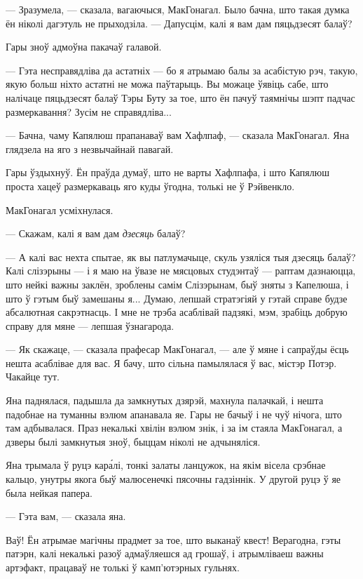 --- Зразумела, --- сказала, вагаючыся, МакГонагал. Было бачна, што такая думка ён 
ніколі дагэтуль не прыходзіла. --- Дапусцім, калі я вам дам пяцьдзесят балаў?

Гары зноў адмоўна пакачаў галавой. 

--- Гэта несправядліва да астатніх --- бо я атрымаю балы за асабістую рэч, такую, якую
больш ніхто астатні не можа паўтарыць. Вы можаце ўявіць сабе, што налічаце пяцьдзесят 
балаў Тэры Буту за тое, што ён пачуў таямнічы шэпт падчас размеркавання? Зусім 
не справядліва...

--- Бачна, чаму Капялюш прапанаваў вам Хафлпаф, --- сказала МакГонагал. Яна глядзела 
на яго з незвычайнай павагай.

Гары ўздыхнуў. Ён праўда думаў, што не варты Хафлпафа, і што Капялюш проста 
хацеў размеркаваць яго куды ўгодна, толькі не ў Рэйвенкло.

МакГонагал усміхнулася.

--- Скажам, калі я вам дам \emph{дзесяць} балаў?

--- А калі вас нехта спытае, як вы патлумачыце, скуль узяліся тыя дзесяць балаў?
Калі слізэрыны --- і я маю на ўвазе не мясцовых студэнтаў --- раптам дазнаюцца,
што нейкі важны заклён, зроблены самім Слізэрынам, быў зняты з Капелюша, і што 
ў гэтым быў замешаны я... Думаю, лепшай стратэгіяй у гэтай справе будзе 
абсалютная сакрэтнасць. І мне не трэба асаблівай падзякі, мэм, зрабіць 
добрую справу для мяне --- лепшая ўзнагарода. 

--- Як скажаце, --- сказала прафесар МакГонагал, --- але ў мяне і сапраўды ёсць нешта
асаблівае для вас. Я бачу, што сільна памылялася ў вас, містэр Потэр. Чакайце тут.

Яна паднялася, падышла да замкнутых дзярэй, махнула палачкай, і нешта падобнае на 
туманны вэлюм апанавала яе. Гары не бачыў і не чуў нічога, што там адбывалася.
Праз некалькі хвілін вэлюм знік, і за ім стаяла МакГонагал, а дзверы былі замкнутыя 
зноў, быццам ніколі не адчыняліся.

Яна трымала ў руцэ кар\'алі, тонкі залаты ланцужок, на якім вісела срэбнае кальцо,
унутры якога быў малюсенечкі пясочны гадзіннік. У другой руцэ ў яе была нейкая папера.

--- Гэта вам, --- сказала яна.

Ваў! Ён атрымае магічны прадмет за тое, што выканаў квест! Верагодна, гэты патэрн,
калі некалькі разоў адмаўляешся ад грошаў, і атрымліваеш важны артэфакт, працаваў 
не толькі ў камп'ютэрных гульнях.

